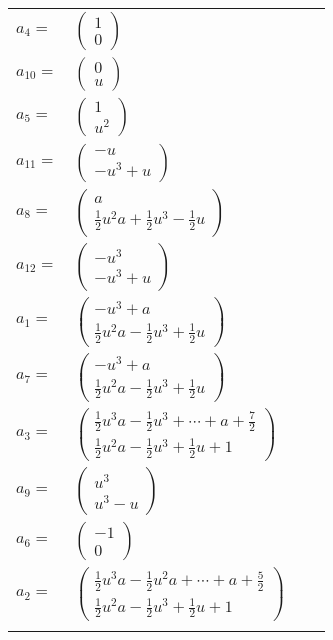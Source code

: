 \documentclass[1p]{elsarticle_modified}
\theoremstyle{definition}
\begin{document}
\begin{tabular}{m{7pt} m{180pt} m{7pt} m{180pt} }
\flushright $a_{4}=$&$\begin{pmatrix}1\\0\end{pmatrix}$ \\
\flushright $a_{10}=$&$\begin{pmatrix}0\\u\end{pmatrix}$ \\
\flushright $a_{5}=$&$\begin{pmatrix}1\\u^2\end{pmatrix}$ \\
\flushright $a_{11}=$&$\begin{pmatrix}- u\\- u^3+u\end{pmatrix}$ \\
\flushright $a_{8}=$&$\begin{pmatrix}a\\\frac{1}{2} u^2 a+\frac{1}{2} u^3-\frac{1}{2} u\end{pmatrix}$ \\
\flushright $a_{12}=$&$\begin{pmatrix}- u^3\\- u^3+u\end{pmatrix}$ \\
\flushright $a_{1}=$&$\begin{pmatrix}- u^3+a\\\frac{1}{2} u^2 a-\frac{1}{2} u^3+\frac{1}{2} u\end{pmatrix}$ \\
\flushright $a_{7}=$&$\begin{pmatrix}- u^3+a\\\frac{1}{2} u^2 a-\frac{1}{2} u^3+\frac{1}{2} u\end{pmatrix}$ \\
\flushright $a_{3}=$&$\begin{pmatrix}\frac{1}{2} u^3 a-\frac{1}{2} u^3+\cdots+a+\frac{7}{2}\\\frac{1}{2} u^2 a-\frac{1}{2} u^3+\frac{1}{2} u+1\end{pmatrix}$ \\
\flushright $a_{9}=$&$\begin{pmatrix}u^3\\u^3- u\end{pmatrix}$ \\
\flushright $a_{6}=$&$\begin{pmatrix}-1\\0\end{pmatrix}$ \\
\flushright $a_{2}=$&$\begin{pmatrix}\frac{1}{2} u^3 a-\frac{1}{2} u^2 a+\cdots+a+\frac{5}{2}\\\frac{1}{2} u^2 a-\frac{1}{2} u^3+\frac{1}{2} u+1\end{pmatrix}$\\&\end{tabular}
\end{document}
